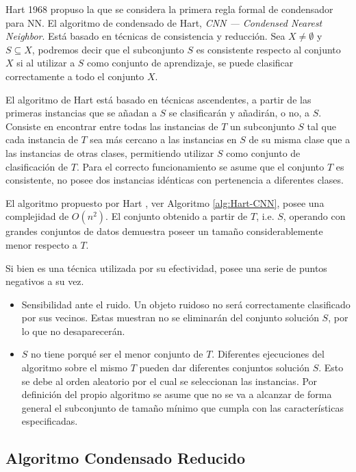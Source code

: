 Hart \cite{hart1968condensed} 1968 propuso la que se considera la primera regla formal de condensador para NN. El algoritmo de condensado de Hart, \textit{CNN --- Condensed Nearest Neighbor}. Está basado en técnicas de consistencia y reducción. Sea $X \not= \emptyset$ y $S \subseteq X$, podremos decir que el subconjunto $S$ es consistente respecto al conjunto $X$ si al utilizar a $S$ como conjunto de aprendizaje, se puede clasificar correctamente a todo el conjunto $X$.

El algoritmo de Hart está basado en técnicas ascendentes, a partir de las primeras instancias que se añadan a $S$ se clasificarán y añadirán, o no, a $S$. Consiste en encontrar entre todas las instancias de $T$ un subconjunto $S$ tal que cada instancia de $T$ sea más cercano a las instancias en $S$ de su misma clase que a las instancias de otras clases, permitiendo utilizar $S$ como conjunto de clasificación de $T$. Para el correcto funcionamiento se asume que el conjunto $T$ es consistente, no posee dos instancias idénticas con pertenencia a diferentes clases.

El algoritmo propuesto por Hart \cite{hart1968condensed}, ver Algoritmo \ref{alg:Hart-CNN}, posee una complejidad de $O(n^2)$. El conjunto obtenido a partir de $T$, i.e. $S$, operando con grandes conjuntos de datos demuestra poseer un tamaño considerablemente menor respecto a $T$. 

Si bien es una técnica utilizada por su efectividad, posee una serie de puntos negativos a su vez.
\begin{itemize}
\item Sensibilidad ante el ruido. Un objeto ruidoso no será correctamente clasificado por sus vecinos. Estas muestran no se eliminarán del conjunto solución $S$, por lo que no desaparecerán.
\item $S$ no tiene porqué ser el menor conjunto de $T$. Diferentes ejecuciones del algoritmo sobre el mismo $T$ pueden dar diferentes conjuntos solución $S$. Esto se debe al orden aleatorio por el cual se seleccionan las instancias. Por definición del propio algoritmo se asume que no se va a alcanzar de forma general el subconjunto de tamaño mínimo que cumpla con las características especificadas.
\end{itemize}

\subsection{Algoritmo Condensado Reducido}

